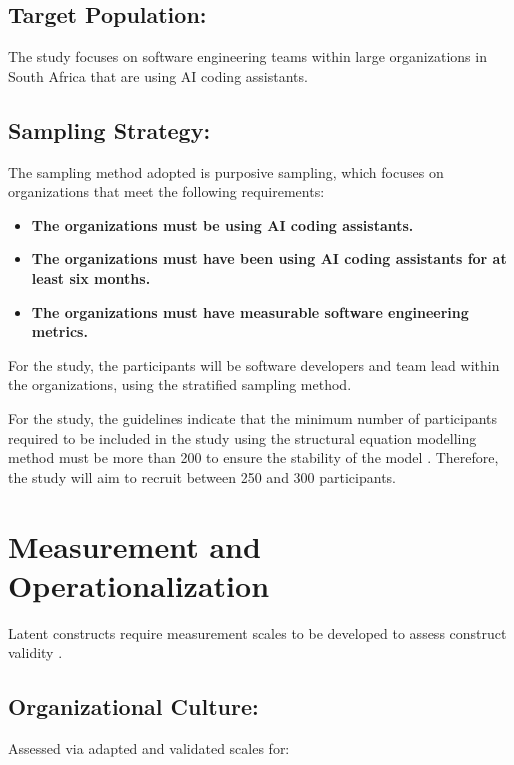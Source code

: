 \subsection {Target Population: }
\label{sec:Target Population}
The study focuses on software engineering teams within large organizations in South Africa that are using AI coding assistants.

\subsection {Sampling Strategy: }
\label{sec:Sampling Strategy}
The sampling method adopted is purposive sampling, which focuses on organizations that meet the following requirements:
\begin{itemize}
	\item \textbf{The organizations must be using AI coding assistants.} 
	\item \textbf{The organizations must have been using AI coding assistants for at least six months.} 
	\item \textbf{The organizations must have measurable software engineering metrics.} 
\end{itemize}

For the study, the participants will be software developers and team lead within the organizations, using the stratified sampling method.

For the study, the guidelines indicate that the minimum number of participants required to be included in the study using the structural equation modelling method must be more than 200 to ensure the stability of the model \autocite{Hair2019}. Therefore, the study will aim to recruit between 250 and 300 participants.

\section{Measurement and Operationalization}
\label{sec:Measurement and Operationalization}
Latent constructs require measurement scales to be developed to assess construct validity \autocite{DeVellis2022}.

\subsection {Organizational Culture: }
\label{sec:Organizational Culture}
Assessed via adapted and validated scales for:

